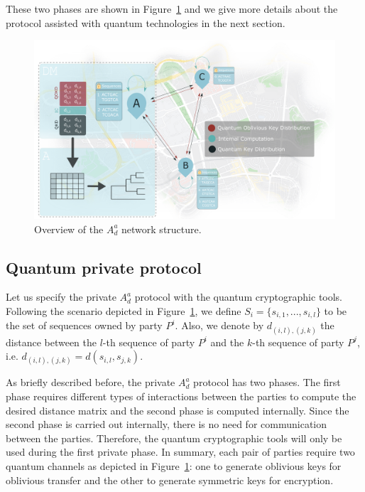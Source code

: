 These two phases are shown in Figure~\ref{fig:network} and we give more details about the protocol assisted with quantum technologies in the next section. 

\begin{figure}[t]
    \centering
    \includegraphics[scale=0.8]{Chapter_PrivatePhylogeneticTrees/PPT.png}
    \caption{Overview of the $A^a_d$ network structure.}
    \label{fig:network}
\end{figure}

\subsection{Quantum private protocol}\label{privProtocol}

Let us specify the private $A_d^a$ protocol with the quantum cryptographic tools. Following the scenario depicted in Figure~\ref{fig:network}, we define $S_i = \{s_{i,1}, ..., s_{i,l}\}$ to be the set of sequences owned by party $P^i$. Also, we denote by $d_{(i,l), (j, k)}$ the distance between the $l$-th sequence of party $P^i$ and the $k$-th sequence of party $P^j$, i.e. $d_{(i,l), (j, k)} = d(s_{i,l}, s_{j,k})$.

As briefly described before, the private $A_d^a$ protocol has two phases. The first phase requires different types of interactions between the parties to compute the desired distance matrix and the second phase is computed internally. Since the second phase is carried out internally, there is no need for communication between the parties. Therefore, the quantum cryptographic tools will only be used during the first private phase. In summary, each pair of parties require two quantum channels as depicted in Figure~\ref{fig:network}: one to generate oblivious keys for oblivious transfer and the other to generate symmetric keys for encryption.

